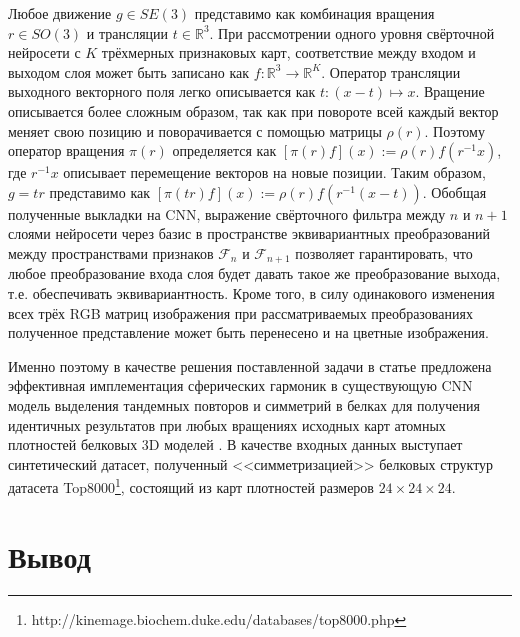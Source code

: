 \documentclass[12pt,twosides]{article}
\begin{document}
	Любое движение $g\in SE(3)$ представимо как комбинация вращения $r\in SO(3)$ и трансляции $t\in\mathbb{R}^3$. При рассмотрении одного уровня свёрточной нейросети с $K$ трёхмерных признаковых карт, соответствие между входом и выходом слоя может быть записано как $f:\mathbb{R}^3\rightarrow\mathbb{R}^K$. Оператор трансляции выходного векторного поля легко описывается как $t:(x-t)\mapsto x$. Вращение описывается более сложным образом, так как при повороте всей каждый вектор меняет свою позицию и поворачивается с помощью матрицы $\rho(r)$. Поэтому оператор вращения $\pi(r)$ определяется как $[\pi(r)f](x):=\rho(r)f(r^{-1}x)$, где $r^{-1}x$ описывает перемещение векторов на новые позиции. Таким образом, $g=tr$ представимо как $[\pi(tr)f](x):=\rho(r)f(r^{-1}(x-t))$. Обобщая полученные выкладки на CNN, выражение свёрточного фильтра между $n$ и $n+1$ слоями нейросети через базис в пространстве эквивариантных преобразований между пространствами признаков $\mathcal{F}_n$ и $\mathcal{F}_{n+1}$ позволяет гарантировать, что любое преобразование входа слоя будет давать такое же преобразование выхода, т.е. обеспечивать эквивариантность. Кроме того, в силу одинакового изменения всех трёх RGB матриц изображения при рассматриваемых преобразованиях полученное представление может быть перенесено и на цветные изображения.
	
	Именно поэтому в качестве решения поставленной задачи в статье предложена эффективная имплементация сферических гармоник в существующую CNN модель выделения тандемных повторов и симметрий в белках для получения идентичных результатов при любых вращениях исходных карт атомных плотностей белковых 3D моделей \cite{DeepSymmetry18}. В качестве входных данных выступает синтетический датасет, полученный <<симметризацией>> белковых структур датасета Top8000\footnote{ http://kinemage.biochem.duke.edu/databases/top8000.php}, состоящий из карт плотностей размеров $24\times24\times24$. 
	
	\section{Вывод}
	
	
	
	
\end{document}
